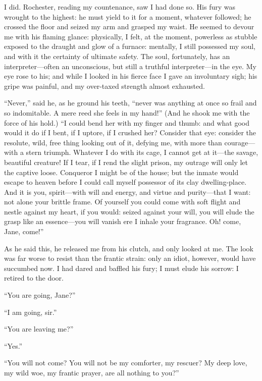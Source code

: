 I did. \Mr{} Rochester, reading my countenance, saw I had done so. His
fury was wrought to the highest: he must yield to it for a moment,
whatever followed; he crossed the floor and seized my arm and grasped my
waist. He seemed to devour me with his flaming glance: physically, I
felt, at the moment, powerless as stubble exposed to the draught and
glow of a furnace: mentally, I still possessed my soul, and with it the
certainty of ultimate safety. The soul, fortunately, has an
interpreter---often an unconscious, but still a truthful
interpreter---in the eye. My eye rose to his; and while I looked in his
fierce face I gave an involuntary sigh; his gripe was painful, and my
over-taxed strength almost exhausted.

\enquote{Never,} said he, as he ground his teeth, \enquote{never was
anything at once so frail and so indomitable. A mere reed she feels in
my hand!} (And he shook me with the force of his hold.) \enquote{I
could bend her with my finger and thumb: and what good would it do if I
bent, if I uptore, if I crushed her? Consider that eye: consider the
resolute, wild, free thing looking out of it, defying me, with more than
courage---with a stern triumph. Whatever I do with its cage, I cannot
get at it---the savage, beautiful creature! If I tear, if I rend the
slight prison, my outrage will only let the captive loose. Conqueror I
might be of the house; but the inmate would escape to heaven before I
could call myself possessor of its clay dwelling-place. And it is you,
spirit---with will and energy, and virtue and purity---that I want: not
alone your brittle frame. Of yourself you could come with soft flight
and nestle against my heart, if you would: seized against your will, you
will elude the grasp like an essence---you will vanish ere I inhale your
fragrance. Oh! come, Jane, come!}

As he said this, he released me from his clutch, and only looked at me. 
The look was far worse to resist than the frantic strain: only an idiot,
however, would have succumbed now. I had dared and baffled his fury; I
must elude his sorrow: I retired to the door.

\enquote{You are going, Jane?}

\enquote{I am going, sir.}

\enquote{You are leaving me?}

\enquote{Yes.}

\enquote{You will not come? You will not be my comforter, my rescuer? 
My deep love, my wild woe, my frantic prayer, are all nothing to you?}


